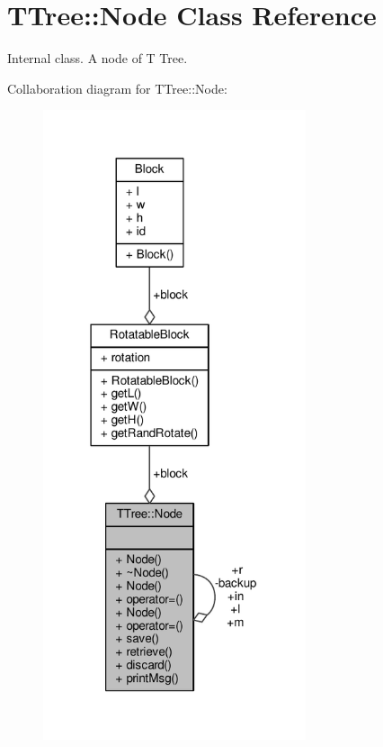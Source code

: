 \hypertarget{classTTree_1_1Node}{}\section{T\+Tree\+:\+:Node Class Reference}
\label{classTTree_1_1Node}


Internal class. A node of T Tree.  




Collaboration diagram for T\+Tree\+:\+:Node\+:
\nopagebreak
\begin{figure}[H]
\begin{center}
\leavevmode
\includegraphics[width=219pt]{classTTree_1_1Node__coll__graph}
\end{center}
\end{figure}
